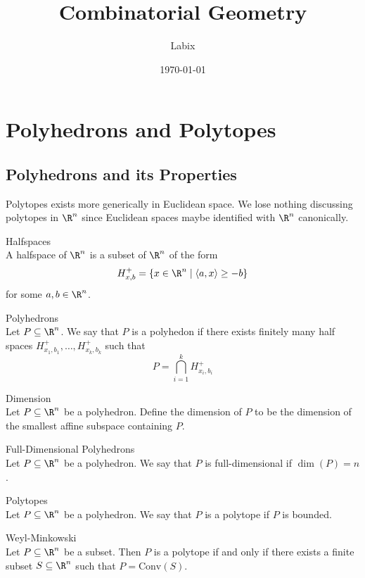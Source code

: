 \documentclass[a4paper]{article}
\title{Combinatorial Geometry}
\author{Labix}
\date{\today}
\begin{document}
\maketitle

\pagebreak
\tableofcontents
\pagebreak
\section{Polyhedrons and Polytopes}
\subsection{Polyhedrons and its Properties}
Polytopes exists more generically in Euclidean space. We lose nothing discussing polytopes in $\R^n$ since Euclidean spaces maybe identified with $\R^n$ canonically. 

\begin{defn}{Halfspaces}{}\\
A halfspace of $\R^n$ is a subset of $\R^n$ of the form $$H_{x,b}^+=\{x\in\R^n\;|\;\langle a,x\rangle\geq -b\}$$ for some $a,b\in\R^n$. 
\end{defn}

\begin{defn}{Polyhedrons}{}\\
Let $P\subseteq\R^n$. We say that $P$ is a polyhedon if there exists finitely many half spaces $H_{x_1,b_1}^+,\dots,H_{x_k,b_k}^+$ such that $$P=\bigcap_{i=1}^kH_{x_i,b_i}^+$$
\end{defn}

\begin{defn}{Dimension}{}\\
Let $P\subseteq\R^n$ be a polyhedron. Define the dimension of $P$ to be the dimension of the smallest affine subspace containing $P$. 
\end{defn}

\begin{defn}{Full-Dimensional Polyhedrons}{}\\
Let $P\subseteq\R^n$ be a polyhedron. We say that $P$ is full-dimensional if $\dim(P)=n$. 
\end{defn}

\begin{defn}{Polytopes}{}\\
Let $P\subseteq\R^n$ be a polyhedron. We say that $P$ is a polytope if $P$ is bounded. 
\end{defn}

\begin{thm}{Weyl-Minkowski}{}\\
Let $P\subseteq\R^n$ be a subset. Then $P$ is a polytope if and only if there exists a finite subset $S\subseteq\R^n$ such that $P=\text{Conv}(S)$. 
\end{thm}
\end{document}
